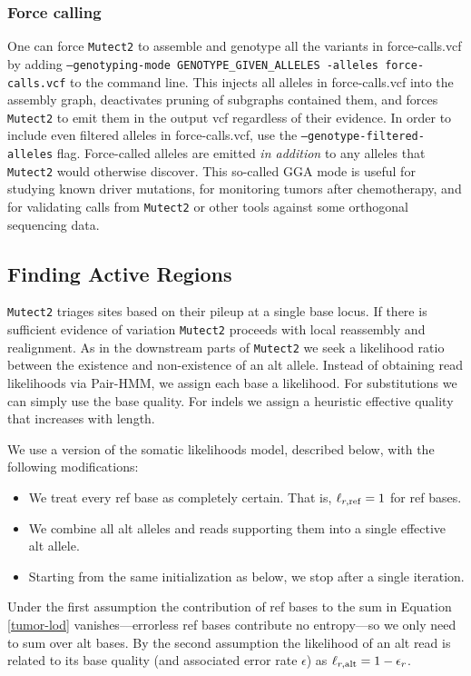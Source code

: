 \documentclass[nofootinbib,amssymb,amsmath]{revtex4}
\newcommand{\code}[1]{\texttt{#1}}
\begin{document}
\subsubsection{Force calling}
One can force \code{Mutect2} to assemble and genotype all the variants in force-calls.vcf by adding \code{--genotyping-mode GENOTYPE\_GIVEN\_ALLELES -alleles force-calls.vcf} to the command line.  This injects all alleles in force-calls.vcf into the assembly graph, deactivates pruning of subgraphs contained them, and forces \code{Mutect2} to emit them in the output vcf regardless of their evidence.  In order to include even filtered alleles in force-calls.vcf, use the \code{--genotype-filtered-alleles} flag.  Force-called alleles are emitted \textit{in addition} to any alleles that \code{Mutect2} would otherwise discover.  This so-called GGA mode is useful for studying known driver mutations, for monitoring tumors after chemotherapy, and for validating calls from \code{Mutect2} or other tools against some orthogonal sequencing data.

\subsection{Finding Active Regions}
\code{Mutect2} triages sites based on their pileup at a single base locus.  If there is sufficient evidence of variation \code{Mutect2} proceeds with local reassembly and realignment.  As in the downstream parts of \code{Mutect2} we seek a likelihood ratio between the existence and non-existence of an alt allele.  Instead of obtaining read likelihoods via Pair-HMM, we assign each base a likelihood.  For substitutions we can simply use the base quality.  For indels we assign a heuristic effective quality that increases with length.

We use a version of the somatic likelihoods model, described below, with the following modifications:
\begin{itemize}
\item We treat every ref base as completely certain.  That is, $\ell_{r,{\rm ref}} = 1$ for ref bases.
\item We combine all alt alleles and reads supporting them into a single effective alt allele.
\item Starting from the same initialization as below, we stop after a single iteration.
\end{itemize}

Under the first assumption the contribution of ref bases to the sum in Equation \ref{tumor-lod} vanishes---errorless ref bases contribute no entropy---so we only need to sum over alt bases.  By the second assumption the likelihood of an alt read is related to its base quality (and associated error rate $\epsilon$) as $\ell_{r,{\rm alt}} = 1 - \epsilon_r$.
\end{document}
